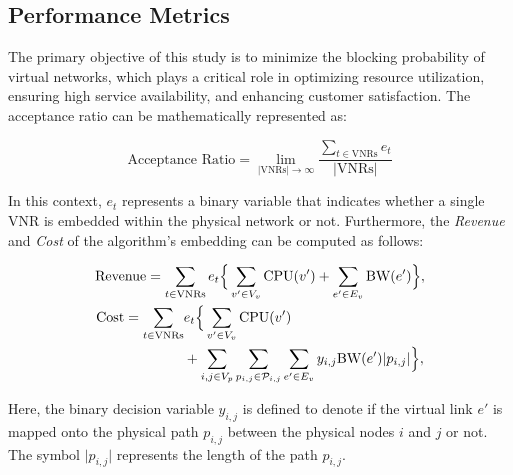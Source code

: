 \subsection{Performance Metrics}
The primary objective of this study is to minimize the blocking probability of virtual networks, which plays a critical role in optimizing resource utilization, ensuring high service availability, and enhancing customer satisfaction. The acceptance ratio can be mathematically represented as:

\fontsize{8}{8}\selectfont
\begin{equation}
    \text{Acceptance Ratio} = 
    \lim_{\vert\text{VNRs}\vert\rightarrow \infty} \frac{\sum_{t\in\text{VNRs}} e_{t}}{\vert\text{VNRs}\vert}
\end{equation}
\normalsize

In this context, $e_t$ represents a binary variable that indicates whether a single VNR is embedded within the physical network or not.
%
Furthermore, the \emph{Revenue} and \emph{Cost} of the algorithm's embedding can be computed as follows:

\fontsize{8}{8}\selectfont
\begin{gather}
    \text{Revenue} 
    =
    \sum_{t\in\text{VNRs}}
    e_{t} \Big\{
    \sum_{v' \in V_v}
    \text{CPU}(v')
    +
    \sum_{e' \in E_v}
    \text{BW}(e')\Big\}, \label{eq_rev} \\
    \begin{split}
        \text{Cost} =
        \sum_{t\in\text{VNRs}} &
        e_{t} \Big\{
        \sum_{v' \in V_v}
        \text{CPU}(v') \\
        & + 
        \sum_{i, j \in V_p}
        \sum_{p_{i,j} \in \mathcal{P}_{i,j}}
        \sum_{e' \in E_v}
        y_{i,j}
        \text{BW}(e')\vert p_{i,j}\vert\Big\},
    \end{split}
    \label{eq_cost} 
\end{gather}
\normalsize

Here, the binary decision variable $y_{i,j}$ is defined to denote if the virtual link $e'$ is mapped onto the physical path $p_{i, j}$ between the physical nodes $i$ and $j$ or not. The symbol $\vert p_{i,j}\vert$ represents the length of the path $p_{i,j}$.




